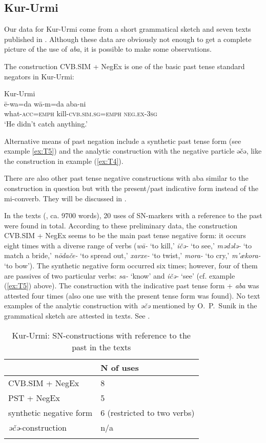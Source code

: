 \documentclass[output=paper]{langscibook}
\begin{document}
\subsection{Kur-Urmi}\label{sec:T5.3}

Our data for Kur-Urmi come from a short grammatical sketch and seven texts published in \citet{sunik1958a}. Although these data are obviously not enough to get a complete picture of the use of \textit{aba}, it is possible to make some observations.

The construction CVB.SIM + NegEx is one of the basic past tense standard negators in Kur-Urmi:

\ea Kur-Urmi \label{ex:T14}\\
	\gll ē-wa=da	wā-m=da	aba-ni\\
	what-\textsc{acc=emph}	kill-\textsc{cvb.sim.sg=emph}	\textsc{neg.ex-3sg}\\
	\glt `He didn’t catch anything.' \citep[134, text]{sunik1958a}
\z

Alternative means of past negation include a synthetic past tense form (see example \ref{ex:T5}) and the analytic construction with the negative particle əčə, like the construction in example (\ref{ex:T4}).

There are also other past tense negative constructions with aba similar to the construction in question but with the present/past indicative form instead of the mi-converb. They will be discussed in .

In the texts (\citealp{sunik1958a}, ca. 9700 words), 20 uses of SN-markers with a reference to the past were found in total. According to these preliminary data, the construction CVB.SIM + NegEx seems to be the main past tense negative form: it occurs eight times with a diverse range of verbs (\textit{wā-} ‘to kill,’ \textit{ičə-} ‘to see,’ \textit{mədələ-} ‘to match a bride,’ \textit{nōdače-} ‘to spread out,’ \textit{xarxe-} ‘to twist,’ \textit{mora-} ‘to cry,’ \textit{m’ækora-} ‘to bow’). The synthetic negative form occurred six times; however, four of them are passives of two particular verbs: \textit{sa-} ‘know’ and \textit{ičə-} ‘see’ (cf. example (\ref{ex:T5}) above). The construction with the indicative past tense form + \textit{aba} was attested four times (also one use with the present tense form was found). No text examples of the analytic construction with \textit{əčə} mentioned by O. P. Sunik in the grammatical sketch are attested in texts. See .

\begin{table}
    \caption{Kur-Urmi: SN-constructions with reference to the past in the texts \citep{sunik1958a}}
    \label{tab:T4}
    \begin{tabular}{ll}
    \lsptoprule
     & N of uses \\ \midrule
    CVB.SIM + NegEx & 8 \\
    PST + NegEx & 5 \\
    synthetic negative form & 6 (restricted to two verbs) \\
    \textit{əčə}-construction & n/a \\
    \lspbottomrule
    \end{tabular}
    \end{table}
\end{document}
